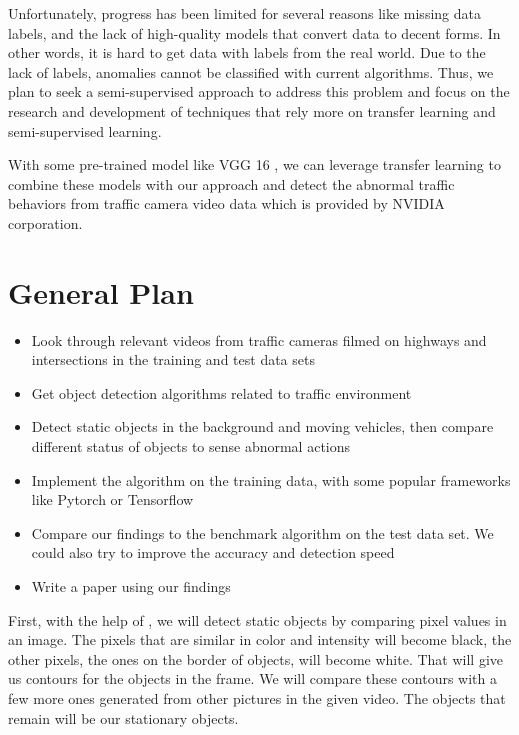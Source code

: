 \documentclass[10pt,twocolumn,letterpaper]{article}
\begin{document}
Unfortunately, progress has been limited for several reasons like missing data labels, and the lack of high-quality models that convert data to decent forms. In other words, it is hard to get data with labels from the real world. Due to the lack of labels, anomalies cannot be classified with current algorithms. Thus, we plan to seek a semi-supervised approach to address this problem and focus on the research and development of techniques that rely more on transfer learning and semi-supervised learning. 

With some pre-trained model like VGG 16 \cite{ren2015faster}, we can leverage transfer learning to combine these models with our approach and detect the abnormal traffic behaviors from traffic camera video data which is provided by NVIDIA corporation.


\section{General Plan}


\begin{itemize}[topsep=0pt, itemsep=-5pt]
   \item  Look through relevant videos from traffic cameras filmed on highways and intersections in the training and test data sets
   \item Get object detection algorithms related to traffic environment
   \item Detect static objects in the background and moving vehicles, then compare different status of objects to sense abnormal actions
   \item Implement the algorithm on the training data, with some popular frameworks like Pytorch or Tensorflow
   \item Compare our findings to the benchmark algorithm on the test data set. We could also try to improve the accuracy and detection speed
   \item Write a paper using our findings
\end{itemize}

First, with the help of \cite{morar2012image}, we will detect static objects by comparing pixel values in an image. The pixels that are similar in color and intensity will become black, the other pixels, the ones on the border of objects, will become white. That will give us contours for the objects in the frame. We will compare these contours with a few more ones generated from other pictures in the given video. The objects that remain will be our stationary objects.
\end{document}

